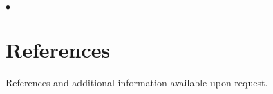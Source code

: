 \documentclass[margin,line,10pt]{res}
\newenvironment{list2}{
  \begin{list}{$\bullet$}{%
      \setlength{\itemsep}{0in}
      \setlength{\parsep}{0in} \setlength{\parskip}{0in}
      \setlength{\topsep}{0in} \setlength{\partopsep}{0in} 
      \setlength{\leftmargin}{0.2in}}}{\end{list}}
\begin{document}
\begin{resume}
\begin{list2}
\begin{itemize}
  \end{itemize}

 
  
\end{list2}




\vspace{0.5cm}
\section{\sc References}
References and additional information available upon request. 

\begin{comment}
\begin{tabular}{ll}
[1] & {\bf \underline{Daniel Gianola}}, Ph.D. Sewall Wright Professor of Animal Breeding and Genetics. \\
    & Department of Animal Sciences, University of Wisconsin-Madison. \\ 
    & Address: 1675 Observatory Dr. Madison, WI 53706-1284.  \\
    & E-mail: gianola -at- ansci.wisc.edu, Phone: 608-265-2054
\end{tabular}
\end{comment}



\end{resume}
\end{document}
